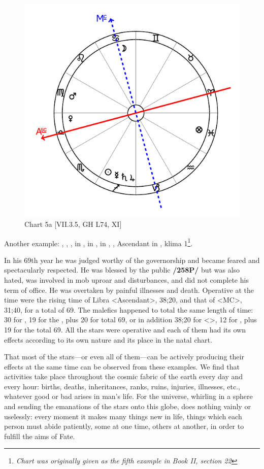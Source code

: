 \begin{figure}
\centering
\vspace{-20pt}
\includegraphics[width=.68\textwidth]{charts/2_21_5}
\caption{Chart 5a [VII.3.5, GH L74, XI]}
\label{fig:chart5a}
\end{figure} 

Another example: \Sun, \Saturn, \Jupiter, \Mercury\xspace in \Sagittarius, \Moon\xspace in \Cancer, \Mars\xspace in \Virgo,
\Venus, Ascendant in \Libra, klima 1\footnote{\textit{Chart was originally given as the fifth example in Book II, section 22}}.

In his 69th year he was judged worthy of the governorship and became feared and spectacularly respected. He was blessed by the public \textbf{/258P/} but was also hated, was involved in mob uproar and disturbances, and did not complete his term of office. He was overtaken by painful illnesses and death. Operative at the time were the rising time of Libra <Ascendant>, 38;20, and
that of \Cancer\xspace <MC>, 31;40, for a total of 69. The malefics happened to total the same length of time: 30 for \Saturn, 19 for the \Sun, plus 20 for \Mercury\xspace total 69, or in addition 38;20 for \Virgo <\Mars>, 12 for \Jupiter, plus 19 for the \Sun\xspace total 69. All the stars were operative and each of them had its own effects according to its own nature and its place in the natal chart.

That most of the stars—or even all of them—can be actively producing their effects at the same time can be observed from these examples. We find that activities take place throughout the cosmic fabric of the
earth every day and every hour: births, deaths, inheritances, ranks, ruins, injuries, illnesses, etc., whatever good or bad arises in man’s life. For the universe, whirling in a sphere and sending the emanations of the stars onto this globe, does nothing vainly or uselessly: every moment it makes many things new in life, things which each person must abide patiently, some at one time, others at another, in order to fulfill the aims of Fate.

